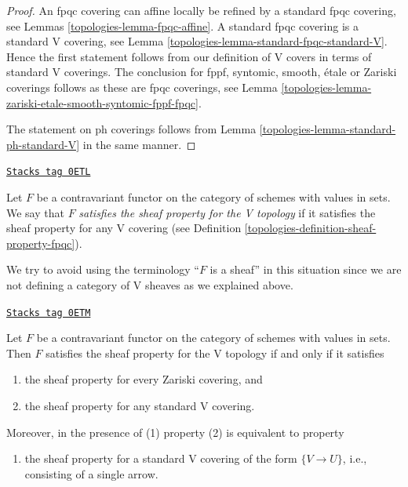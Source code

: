 \begin{proof}

An fpqc covering can affine locally be refined by a
standard fpqc covering, see Lemmas \ref{topologies-lemma-fpqc-affine}.
A standard fpqc covering is a standard V covering, see
Lemma \ref{topologies-lemma-standard-fpqc-standard-V}. Hence the first statement
follows from our definition of V covers in terms of standard V coverings.
The conclusion for fppf, syntomic, smooth, \'etale or Zariski coverings
follows as these are fpqc coverings, see
Lemma \ref{topologies-lemma-zariski-etale-smooth-syntomic-fppf-fpqc}.

\medskip\noindent
The statement on ph coverings follows from
Lemma \ref{topologies-lemma-standard-ph-standard-V} in the same manner.
\end{proof}

\begin{definition}
\label{topologies-definition-sheaf-property-V}
\href{https://stacks.math.columbia.edu/tag/0ETL}{\texttt{Stacks tag 0ETL}}

Let $F$ be a contravariant functor on the category
of schemes with values in sets. We say that
$F$ {\it satisfies the sheaf property for the V topology}
if it satisfies the sheaf property for any V covering
(see Definition \ref{topologies-definition-sheaf-property-fpqc}).
\end{definition}

We try to avoid using the terminology ``$F$ is a sheaf'' in this
situation since we are not defining a category of V sheaves
as we explained above.

\begin{lemma}
\label{topologies-lemma-sheaf-property-V}
\href{https://stacks.math.columbia.edu/tag/0ETM}{\texttt{Stacks tag 0ETM}}

Let $F$ be a contravariant functor on the category
of schemes with values in sets. Then $F$ satisfies
the sheaf property for the V topology if and only
if it satisfies
\begin{enumerate}
\item the sheaf property for every Zariski covering, and
\item the sheaf property for any standard V covering.
\end{enumerate}
Moreover, in the presence of (1) property (2) is equivalent to
property
\begin{enumerate}
\item[(2')] the sheaf property for a standard V covering
of the form $\{V \to U\}$, i.e., consisting of a single arrow.
\end{enumerate}
\end{lemma}

